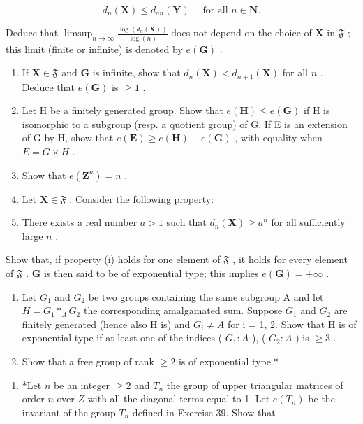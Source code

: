 \[
d _ {n} (\mathbf {X}) \leqslant d _ {a n} (\mathbf {Y}) \quad \text { for   all } n \in \mathbf {N}.
\]

Deduce that \(\limsup_{n\to \infty}\frac{\log(d_n(\mathbf{X}))}{\log(n)}\) does not depend on the choice of \(\mathbf{X}\) in \(\mathfrak{F}\) ; this limit (finite or infinite) is denoted by \(e(\mathbf{G})\) .

\begin{enumerate}
\def\labelenumi{(\alph{enumi})}
\setcounter{enumi}{1}
\item
  If \(\mathbf{X} \in \mathfrak{F}\) and \(\mathbf{G}\) is infinite, show that \(d_n(\mathbf{X}) < d_{n+1}(\mathbf{X})\) for all \(n\) . Deduce that \(e(\mathbf{G})\) is \(\geqslant 1\) .
\item
  Let H be a finitely generated group. Show that \(e(\mathbf{H}) \leqslant e(\mathbf{G})\) if H is isomorphic to a subgroup (resp. a quotient group) of G. If E is an extension of G by H, show that \(e(\mathbf{E}) \geqslant e(\mathbf{H}) + e(\mathbf{G})\) , with equality when \(E = G \times H\) .
\item
  Show that \(e(\mathbf{Z}^n) = n\) .
\item
  Let \(\mathbf{X} \in \mathfrak{F}\) . Consider the following property:
\item
  There exists a real number \(a > 1\) such that \(d_n(\mathbf{X}) \geqslant a^n\) for all sufficiently large \(n\) .
\end{enumerate}

Show that, if property (i) holds for one element of \(\mathfrak{F}\) , it holds for every element of \(\mathfrak{F}\) . \(\mathbf{G}\) is then said to be of exponential type; this implies \(e(\mathbf{G}) = +\infty\) .

\begin{enumerate}
\def\labelenumi{(\alph{enumi})}
\setcounter{enumi}{5}
\item
  Let \(G_{1}\) and \(G_{2}\) be two groups containing the same subgroup A and let \(H = G_{1} *_{A} G_{2}\) the corresponding amalgamated sum. Suppose \(G_{1}\) and \(G_{2}\) are finitely generated (hence also H is) and \(G_{i} \neq A\) for i = 1, 2. Show that H is of exponential type if at least one of the indices ( \(G_{1}:A\) ), ( \(G_{2}:A\) ) is \(\geqslant 3\) .
\item
  Show that a free group of rank \(\geqslant 2\) is of exponential type.*
\end{enumerate}

\begin{enumerate}
\def\labelenumi{\arabic{enumi}.}
\setcounter{enumi}{39}
\tightlist
\item
  *Let \(n\) be an integer \(\geqslant 2\) and \(T_n\) the group of upper triangular matrices of order \(n\) over \(Z\) with all the diagonal terms equal to 1. Let \(e(T_n)\) be the invariant of the group \(T_n\) defined in Exercise 39. Show that
\end{enumerate}


